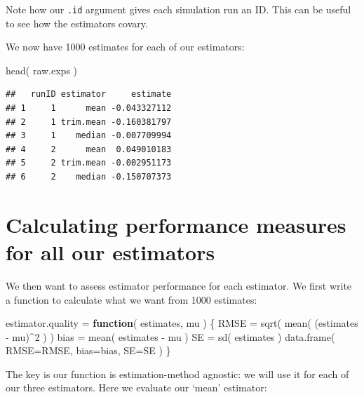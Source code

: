 \documentclass[
]{book}
\newenvironment{Shaded}{\begin{snugshade}}{\end{snugshade}}
\newcommand{\AttributeTok}[1]{\textcolor[rgb]{0.77,0.63,0.00}{#1}}
\newcommand{\ControlFlowTok}[1]{\textcolor[rgb]{0.13,0.29,0.53}{\textbf{#1}}}
\newcommand{\DecValTok}[1]{\textcolor[rgb]{0.00,0.00,0.81}{#1}}
\newcommand{\FunctionTok}[1]{\textcolor[rgb]{0.00,0.00,0.00}{#1}}
\newcommand{\NormalTok}[1]{#1}
\newcommand{\OtherTok}[1]{\textcolor[rgb]{0.56,0.35,0.01}{#1}}
\newcommand{\SpecialCharTok}[1]{\textcolor[rgb]{0.00,0.00,0.00}{#1}}
\begin{document}
Note how our \texttt{.id} argument gives each simulation run an ID. This can be
useful to see how the estimators covary.

We now have 1000 estimates for each of our estimators:

\begin{Shaded}
\begin{Highlighting}[]
\FunctionTok{head}\NormalTok{( raw.exps )}
\end{Highlighting}
\end{Shaded}

\begin{verbatim}
##   runID estimator     estimate
## 1     1      mean -0.043327112
## 2     1 trim.mean -0.160381797
## 3     1    median -0.007709994
## 4     2      mean  0.049010183
## 5     2 trim.mean -0.002951173
## 6     2    median -0.150707373
\end{verbatim}

\hypertarget{calculating-performance-measures-for-all-our-estimators}{%
\section{Calculating performance measures for all our estimators}\label{calculating-performance-measures-for-all-our-estimators}}

We then want to assess estimator performance for each estimator.
We first write a function to calculate what we want from 1000 estimates:

\begin{Shaded}
\begin{Highlighting}[]
\NormalTok{estimator.quality }\OtherTok{=} \ControlFlowTok{function}\NormalTok{( estimates, mu ) \{}
\NormalTok{    RMSE }\OtherTok{=} \FunctionTok{sqrt}\NormalTok{( }\FunctionTok{mean}\NormalTok{( (estimates }\SpecialCharTok{{-}}\NormalTok{ mu)}\SpecialCharTok{\^{}}\DecValTok{2}\NormalTok{ ) )}
\NormalTok{    bias }\OtherTok{=} \FunctionTok{mean}\NormalTok{( estimates }\SpecialCharTok{{-}}\NormalTok{ mu )}
\NormalTok{    SE }\OtherTok{=} \FunctionTok{sd}\NormalTok{( estimates )}
    \FunctionTok{data.frame}\NormalTok{( }\AttributeTok{RMSE=}\NormalTok{RMSE, }\AttributeTok{bias=}\NormalTok{bias, }\AttributeTok{SE=}\NormalTok{SE )}
\NormalTok{\}}
\end{Highlighting}
\end{Shaded}

The key is our function is estimation-method agnostic: we will use it for each of our three estimators.
Here we evaluate our `mean' estimator:
\end{document}
